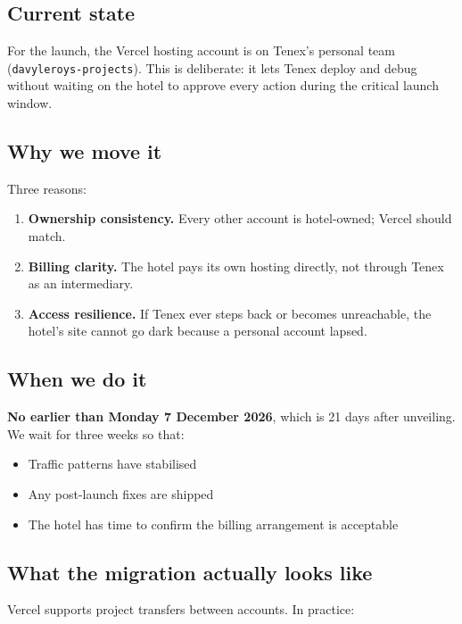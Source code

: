 \documentclass[11pt,a4paper]{article}
\begin{document}
\subsection{Current state}

For the launch, the Vercel hosting account is on Tenex's personal team (\texttt{davyleroys-projects}). This is deliberate: it lets Tenex deploy and debug without waiting on the hotel to approve every action during the critical launch window.

\subsection{Why we move it}

Three reasons:

\begin{enumerate}
\item \textbf{Ownership consistency.} Every other account is hotel-owned; Vercel should match.
\item \textbf{Billing clarity.} The hotel pays its own hosting directly, not through Tenex as an intermediary.
\item \textbf{Access resilience.} If Tenex ever steps back or becomes unreachable, the hotel's site cannot go dark because a personal account lapsed.
\end{enumerate}

\subsection{When we do it}

\textbf{No earlier than Monday 7 December 2026}, which is 21 days after unveiling. We wait for three weeks so that:

\begin{itemize}
\item Traffic patterns have stabilised
\item Any post-launch fixes are shipped
\item The hotel has time to confirm the billing arrangement is acceptable
\end{itemize}

\subsection{What the migration actually looks like}

Vercel supports project transfers between accounts. In practice:
\end{document}
